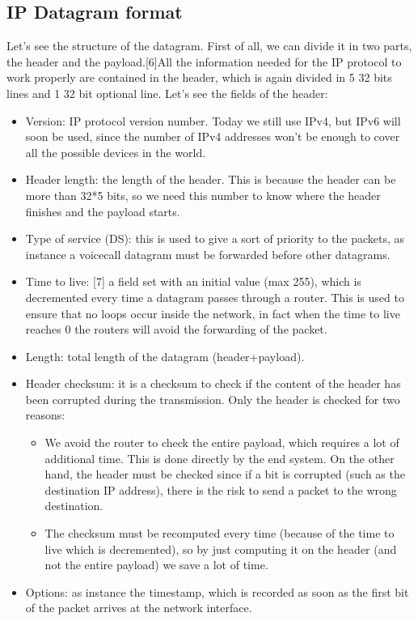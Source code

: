 \subsection{IP Datagram format}
Let's see the structure of the datagram. First of all, we can divide it in two parts, the header and the payload.[6]All the information needed for the IP protocol to work properly are contained in the header, which is again divided in 5 32 bits lines and 1 32 bit optional line. Let's see the fields of the header:
\begin{itemize}
    \item Version: IP protocol version number. Today we still use IPv4, but IPv6 will soon be used, since the number of IPv4 addresses won't be enough to cover all the possible devices in the world.
    \item Header length: the length of the header. This is because the header can be more than 32*5 bits, so we need this number to know where the header finishes and the payload starts.
    \item Type of service (DS): this is used to give a sort of priority to the packets, as instance a voicecall datagram must be forwarded before other datagrams.
    \item Time to live: [7] a field set with an initial value (max 255), which is decremented every time a datagram passes through a router. This is used to ensure that no loops occur inside the network, in fact when the time to live reaches 0 the routers will avoid the forwarding of the packet.
    \item Length: total length of the datagram (header+payload).
    \item Header checksum: it is a checksum to check if the content of the header has been corrupted during the transmission. Only the header is checked for two reasons:
    \begin{itemize}
        \item We avoid the router to check the entire payload, which requires a lot of additional time. This is done directly by the end system. On the other hand, the header must be checked since if a bit is corrupted (such as the destination IP address), there is the risk to send a packet to the wrong destination.
        \item The checksum must be recomputed every time (because of the time to live which is decremented), so by just computing it on the header (and not the entire payload) we save a lot of time.
    \end{itemize}
    \item Options: as instance the timestamp, which is recorded as soon as the first bit of the packet arrives at the network interface.
\end{itemize}
